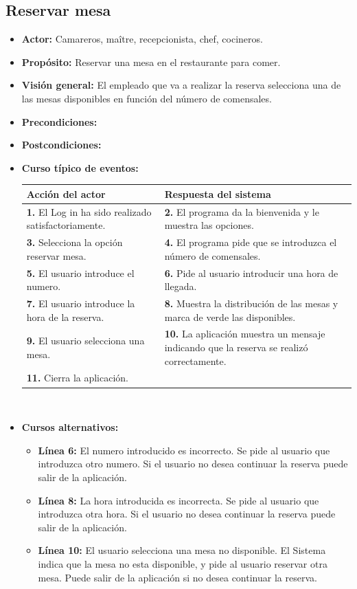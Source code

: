 \documentclass[spanish,a4paper,11pt, twoside]{report}	%
\begin{document}
		\subsection{Reservar mesa} 
			\begin{itemize}
			\item \textbf{Actor:} Camareros, maître, recepcionista, chef, cocineros.
			\item \textbf{Propósito:} Reservar una mesa en el restaurante para comer.
			\item \textbf{Visión general:} El empleado que va a realizar la reserva selecciona una de las mesas disponibles en función del número de comensales.
			\item \textbf{Precondiciones:} 
			\item \textbf{Postcondiciones:} 
			\item \textbf{Curso típico de eventos:} 	\\
				\begin{tabular}{|p{6cm}||p{6cm}|}
				\hline
				\textbf{Acción del actor} & \textbf{Respuesta del sistema} \\ \hline \hline
				\textbf{1.}  El Log in ha sido realizado satisfactoriamente. & \textbf{2.} El programa da la bienvenida y le muestra las opciones. \\ \hline
				\textbf{3.} Selecciona la opción reservar mesa. & \textbf{4.} El programa pide que se introduzca el número de comensales. \\ \hline
				\textbf{5.} El usuario introduce el numero.	& \textbf{6.} Pide al usuario introducir una hora de llegada. \\ \hline
				\textbf{7.} El usuario introduce la hora de la reserva.	& \textbf{8.} Muestra la distribución de las mesas y marca de verde las disponibles. \\ \hline
				\textbf{9.} El usuario selecciona una mesa. & \textbf{10.} La aplicación muestra un mensaje indicando que la reserva se realizó correctamente. \\ \hline
				\textbf{11.} Cierra la aplicación. & \textbf{} \\ \hline
			\end{tabular}
			\\
			\item \textbf{Cursos alternativos:} 
			\begin{itemize}
			\item  \textbf{Línea 6:} El numero introducido es incorrecto. Se pide al usuario que introduzca otro numero. Si el usuario no desea continuar la reserva puede salir de la aplicación.
			\item  \textbf{Línea 8:} La hora introducida es incorrecta. Se pide al usuario que introduzca otra hora. Si el usuario no desea continuar la reserva puede salir de la aplicación.
			\item  \textbf{Línea 10:} El usuario selecciona una mesa no disponible. El Sistema indica que la mesa no esta disponible, y pide al usuario reservar otra mesa. Puede salir de la aplicación si no desea continuar la reserva.
			\end {itemize}
		\end {itemize}
		
\end{document}
